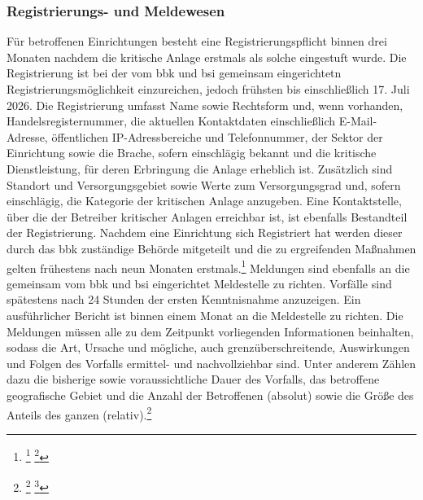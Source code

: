 \documentclass[11pt,a4paper,hidelinks]{article}   %
\begin{document}
                \subsubsection{Registrierungs- und Meldewesen}
                Für betroffenen Einrichtungen besteht eine Registrierungspflicht binnen drei Monaten nachdem die kritische Anlage erstmals als solche eingestuft wurde. Die Registrierung ist bei der vom \gls{bbk} und \gls{bsi} gemeinsam eingerichtetn Registrierungsmöglichkeit einzureichen, jedoch frühsten bis einschließlich 17. Juli 2026. Die Registrierung umfasst Name sowie Rechtsform und, wenn vorhanden, Handelsregisternummer, die aktuellen Kontaktdaten einschließlich E-Mail-Adresse, öffentlichen IP-Adressbereiche und Telefonnummer, der Sektor der Einrichtung sowie die Brache, sofern einschlägig bekannt und die kritische Dienstleistung, für deren Erbringung die Anlage erheblich ist. Zusätzlich sind Standort und Versorgungsgebiet sowie Werte zum Versorgungsgrad und, sofern einschlägig, die Kategorie der kritischen Anlage anzugeben. Eine Kontaktstelle, über die der Betreiber kritischer Anlagen erreichbar ist, ist ebenfalls Bestandteil der Registrierung. Nachdem eine Einrichtung sich Registriert hat werden dieser durch das \gls{bbk} zuständige Behörde mitgeteilt und die zu ergreifenden Maßnahmen gelten frühestens nach neun Monaten erstmals.\footnote{
                    \footcite[Vgl. §5, Absatz 1,][]{KRITIS-DachG}
                    \footcite[Vgl. §8,][]{KRITIS-DachG}
                }
                Meldungen sind ebenfalls an die gemeinsam vom \gls{bbk} und \gls{bsi} eingerichtet Meldestelle zu richten. Vorfälle sind spätestens nach 24 Stunden der ersten Kenntnisnahme anzuzeigen. Ein ausführlicher Bericht ist binnen einem Monat an die Meldestelle zu richten. Die Meldungen müssen alle zu dem Zeitpunkt vorliegenden Informationen beinhalten, sodass die Art, Ursache und mögliche, auch grenzüberschreitende, Auswirkungen und Folgen des Vorfalls ermittel- und nachvollziehbar sind. Unter anderem Zählen dazu die bisherige sowie voraussichtliche Dauer des Vorfalls, das betroffene geografische Gebiet und die Anzahl der Betroffenen (absolut) sowie die Größe des Anteils des ganzen (relativ).\footnote{
                    \footcite[Vgl. §18,][]{KRITIS-DachG}
                    \footcite[Vgl. §32, Absatz 1,][]{NIS2UmsuCG}
                }
\end{document}

